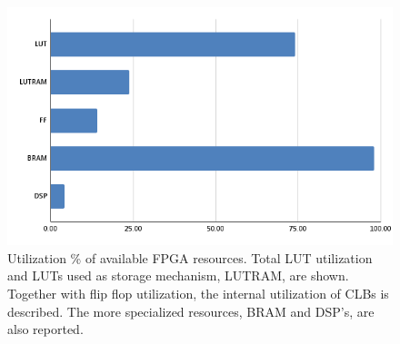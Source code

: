 \documentclass[12pt]{report}
\begin{document}
\begin{figure}[h]
    \centering
    \includegraphics[scale=0.65]{figures/utilization.png}
    \caption{Utilization \% of available FPGA resources. Total LUT utilization and LUTs used as storage mechanism, LUTRAM, are shown. Together with flip flop utilization, the internal utilization of CLBs is described. The more specialized resources, BRAM and DSP's, are also reported.}
    \label{fig:fpga_util}
\end{figure}
\end{document}
